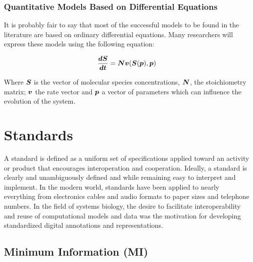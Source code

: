 \subsubsection{Quantitative Models Based on Differential Equations}

It is probably fair to say that most of the successful models to be
found in the literature are based on ordinary differential equations.
Many researchers will express these models using the following equation:

\begin{equation} \label{eq:system}
        \frac{\mbox{\boldmath $dS$}}{\mbox{\boldmath $dt$}} = \mbox{\boldmath $N$} \mbox{\boldmath $v$} (\mbox{\boldmath $S$} (\mbox{\boldmath $p$}), \mbox{\boldmath $p$})
\end{equation}

Where $\mbox{\boldmath $S$}$ is the vector of molecular species concentrations, $\mbox{\boldmath $N$}$,
the stoichiometry matrix; $\mbox{\boldmath $v$}$ the rate vector and $\mbox{\boldmath $p$}$ a vector of
parameters which can influence the evolution of the system. 

\section{Standards}

A standard is defined as a uniform set of specifications applied toward
an activity or product that encourages interoperation and cooperation.
Ideally, a standard is clearly and unambiguously defined and while
remaining easy to interpret and implement. In the modern world,
standards have been applied to nearly everything from electronics cables
and audio formats to paper sizes and telephone numbers. In the field of
systems biology, the desire to facilitate interoperability and reuse of
computational models and data was the motivation for developing
standardized digital annotations and representations.

\subsection{Minimum Information (MI)}

